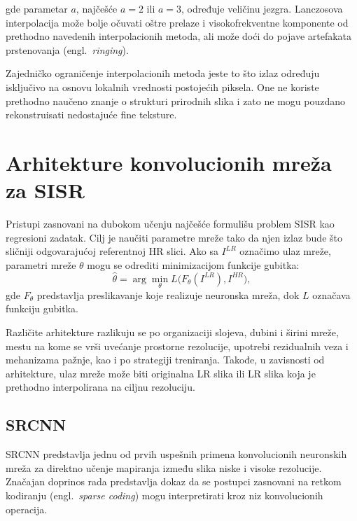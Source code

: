 \documentclass[12pt,a4paper]{article}
\begin{document}
gde parametar $a$, najčešće $a=2$ ili $a=3$, određuje veličinu jezgra. Lanczosova interpolacija može bolje očuvati oštre prelaze i visokofrekventne komponente od prethodno navedenih interpolacionih metoda, ali može doći do pojave artefakata prstenovanja (engl.\ \textit{ringing}).

Zajedničko ograničenje interpolacionih metoda jeste to što izlaz određuju isključivo na osnovu lokalnih vrednosti postojećih piksela. One ne koriste prethodno naučeno znanje o strukturi prirodnih slika i zato ne mogu pouzdano rekonstruisati nedostajuće fine teksture.

\section{Arhitekture konvolucionih mreža za SISR}
\label{sec:arhitekture}

Pristupi zasnovani na dubokom učenju najčešće formulišu problem SISR kao regresioni zadatak. Cilj je naučiti parametre mreže tako da njen izlaz bude što sličniji odgovarajućoj referentnoj HR slici. Ako sa $I^{LR}$ označimo ulaz mreže, parametri mreže $\theta$ mogu se odrediti minimizacijom funkcije gubitka:
\begin{equation}
	\hat{\theta}
	=
	\arg\min_{\theta}
	L\bigl(F_{\theta}(I^{LR}), I^{HR}\bigr),
\end{equation}
gde $F_{\theta}$ predstavlja preslikavanje koje realizuje neuronska mreža, dok $L$ označava funkciju gubitka.

Različite arhitekture razlikuju se po organizaciji slojeva, dubini i širini mreže, mestu na kome se vrši uvećanje prostorne rezolucije, upotrebi rezidualnih veza i mehanizama pažnje, kao i po strategiji treniranja. Takođe, u zavisnosti od arhitekture, ulaz mreže može biti originalna LR slika ili LR slika koja je prethodno interpolirana na ciljnu rezoluciju.

\subsection{SRCNN}

SRCNN \cite{SRCNN} predstavlja jednu od prvih uspešnih primena konvolucionih neuronskih mreža za direktno učenje mapiranja između slika niske i visoke rezolucije. Značajan doprinos rada predstavlja dokaz da se postupci zasnovani na retkom kodiranju (engl.\ \textit{sparse coding}) \cite{yang2010} mogu interpretirati kroz niz konvolucionih operacija.
\end{document}
